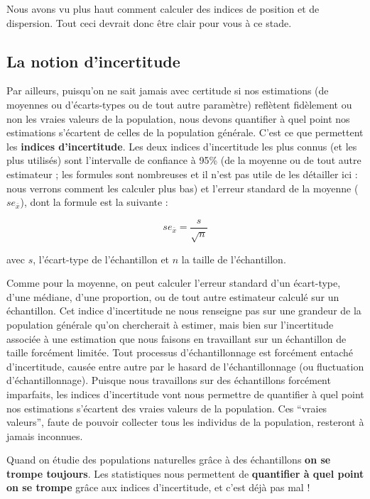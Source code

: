 \documentclass[
  a4paper,
  DIV=11,
  numbers=noendperiod,
  oneside]{scrreprt}
\begin{document}
Nous avons vu plus haut comment calculer des indices de position et de
dispersion. Tout ceci devrait donc être clair pour vous à ce stade.

\hypertarget{la-notion-dincertitude}{%
\subsection{La notion d'incertitude}\label{la-notion-dincertitude}}

Par ailleurs, puisqu'on ne sait jamais avec certitude si nos estimations
(de moyennes ou d'écarts-types ou de tout autre paramètre) reflètent
fidèlement ou non les vraies valeurs de la population, nous devons
quantifier à quel point nos estimations s'écartent de celles de la
population générale. C'est ce que permettent les \textbf{indices
d'incertitude}. Les deux indices d'incertitude les plus connus (et les
plus utilisés) sont l'intervalle de confiance à 95\% (de la moyenne ou
de tout autre estimateur ; les formules sont nombreuses et il n'est pas
utile de les détailler ici : nous verrons comment les calculer plus bas)
et l'erreur standard de la moyenne (\(se_{\bar{x}}\)), dont la formule
est la suivante :

\[se_{\bar{x}} = \frac{s}{\sqrt{n}}\]

avec \(s\), l'écart-type de l'échantillon et \(n\) la taille de
l'échantillon.

Comme pour la moyenne, on peut calculer l'erreur standard d'un
écart-type, d'une médiane, d'une proportion, ou de tout autre estimateur
calculé sur un échantillon. Cet indice d'incertitude ne nous renseigne
pas sur une grandeur de la population générale qu'on chercherait à
estimer, mais bien sur l'incertitude associée à une estimation que nous
faisons en travaillant sur un échantillon de taille forcément limitée.
Tout processus d'échantillonnage est forcément entaché d'incertitude,
causée entre autre par le hasard de l'échantillonnage (ou fluctuation
d'échantillonnage). Puisque nous travaillons sur des échantillons
forcément imparfaits, les indices d'incertitude vont nous permettre de
quantifier à quel point nos estimations s'écartent des vraies valeurs de
la population. Ces ``vraies valeurs'', faute de pouvoir collecter tous
les individus de la population, resteront à jamais inconnues.

\begin{tcolorbox}[enhanced jigsaw, toprule=.15mm, coltitle=black, colframe=quarto-callout-important-color-frame, titlerule=0mm, leftrule=.75mm, opacityback=0, bottomrule=.15mm, title=\textcolor{quarto-callout-important-color}{\faExclamation}\hspace{0.5em}{Autrement dit\ldots{}}, colbacktitle=quarto-callout-important-color!10!white, breakable, colback=white, left=2mm, toptitle=1mm, arc=.35mm, bottomtitle=1mm, rightrule=.15mm, opacitybacktitle=0.6]
Quand on étudie des populations naturelles grâce à des échantillons
\textbf{on se trompe toujours}. Les statistiques nous permettent de
\textbf{quantifier à quel point on se trompe} grâce aux indices
d'incertitude, et c'est déjà pas mal !
\end{tcolorbox}
\end{document}
